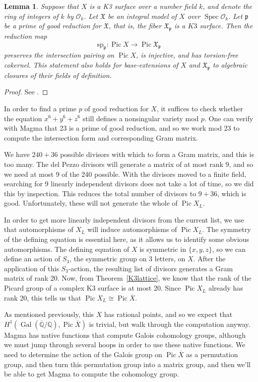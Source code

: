 \documentclass[12pt,twoside]{reedthesis}
\theoremstyle{plain}
\newtheorem{lemma}[theorem]{Lemma}
\theoremstyle{definition}
\theoremstyle{remark}
\newcommand{\QQ}{\mathbb{Q}}
\newcommand{\calO}{\mathcal{O}}
\newcommand{\Spec}{\operatorname{Spec}}
\newcommand{\Pic}{\operatorname{Pic}}
\newcommand{\Gal}{\operatorname{Gal}}
\begin{document}
\begin{lemma}
Suppose that $X$ is a K3 surface over a number field $k$, and denote the ring of integers of $k$ by $\calO_k$. Let $\mathfrak{X}$ be an integral model of $X$ over $\Spec\calO_k$. Let $\mathfrak{p}$ be a prime of good reduction for $\mathfrak{X}$, that is, the fiber $\mathfrak{X}_\mathfrak{p}$ is a $K3$ surface. Then the reduction map
\[\text{sp}_\mathfrak{p}:\Pic X\to\Pic\mathfrak{X}_\mathfrak{p}\]
preserves the intersection pairing on $\Pic X$, is injective, and has torsion-free cokernel. This statement also holds for base-extensions of $X$ and $\mathfrak{X}_\mathfrak{p}$ to algebraic closures of their fields of definition.
\end{lemma}
\begin{proof}
See \cite[Lemma 1.2.52]{festiThesis}.
\end{proof}
\noindent In order to find a prime $p$ of good reduction for $X$, it suffices to check whether the equation $x^6+y^6+z^6$ still defines a nonsingular variety mod $p$. One can verify with Magma that 23 is a prime of good reduction, and so we work mod 23 to compute the intersection form and corresponding Gram matrix.

We have $240+36$ possible divisors with which to form a Gram matrix, and this is too many. The del Pezzo divisors will generate a matrix of at most rank 9, and so we need at most 9 of the 240 possible. With the divisors moved to a finite field, searching for 9 linearly independent divisors does not take a lot of time, so we did this by inspection. This reduces the total number of divisors to $9+36$, which is good. Unfortunately, these will not generate the whole of $\Pic X_L$.

 In order to get more linearly independent divisors from the current list, we use that automorphisms of $X_L$ will induce automorphisms of $\Pic X_L$. The symmetry of the defining equation is essential here, as it allows us to identify some obvious automorphisms. The defining equation of $X$ is symmetric in $\{x,y,z\}$, so we can define an action of $S_3$, the symmetric group on 3 letters, on $X$. After the application of this $S_3$-action, the resulting list of divisors generates a Gram matrix of rank 20. Now, from Theorem~\ref{K3lattice}, we know that the rank of the Picard group of a complex K3 surface is at most 20. Since $\Pic X_L$ already has rank 20, this tells us that $\Pic X_L\cong\Pic\overline{X}$. 
 
As mentioned previously, this $X$ has rational points, and so we expect that $H^1(\Gal(\overline{\QQ}/\QQ),\Pic\overline{X})$ is trivial, but walk through the computation anyway. Magma has native functions that compute Galois cohomology groups, although we must jump through several hoops in order to use these native functions. We need to determine the action of the Galois group on $\Pic\overline{X}$ as a permutation group, and then turn this permutation group into a matrix group, and then we'll be able to get Magma to compute the cohomology group.
\end{document}
